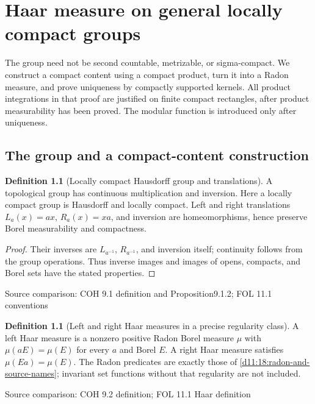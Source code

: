 \documentclass[11pt,oneside,openany]{book}
\theoremstyle{definition}
\newtheorem{definition}[theorem]{Definition}
\theoremstyle{remark}
\newcommand{\family}[1]{}
\newcommand{\source}[1]{\par\begingroup\small\sffamily\color{black!65}Source comparison: #1\par\endgroup}
\begin{document}


\chapter{Haar measure on general locally compact groups}\label{ch:d11-21}

The group need not be second countable, metrizable, or sigma-compact. We construct a compact content using a compact product, turn it into a Radon measure, and prove uniqueness by compactly supported kernels. All product integrations in that proof are justified on finite compact rectangles, after product measurability has been proved. The modular function is introduced only after uniqueness.

\section{The group and a compact-content construction}

\begin{definition}[Locally compact Hausdorff group and translations]\family{D11.21.lch_group_interface}\label{d11:21:lch-group-interface}
A topological group has continuous multiplication and inversion. Here a locally compact group is Hausdorff and locally compact. Left and right translations $L_a(x)=ax$, $R_a(x)=xa$, and inversion are homeomorphisms, hence preserve Borel measurability and compactness.
\end{definition}
\begin{proof}
Their inverses are $L_{a^{-1}}$, $R_{a^{-1}}$, and inversion itself; continuity follows from the group operations. Thus inverse images and images of opens, compacts, and Borel sets have the stated properties.
\end{proof}
\source{COH 9.1 definition and Proposition9.1.2; FOL 11.1 conventions}

\begin{definition}[Left and right Haar measures in a precise regularity class]\family{D11.21.haar_definition}\label{d11:21:haar-definition}
A left Haar measure is a nonzero positive Radon Borel measure $\mu$ with $\mu(aE)=\mu(E)$ for every $a$ and Borel $E$. A right Haar measure satisfies $\mu(Ea)=\mu(E)$. The Radon predicates are exactly those of \cref{d11:18:radon-and-source-names}; invariant set functions without that regularity are not included.
\end{definition}
\source{COH 9.2 definition; FOL 11.1 Haar definition}
\end{document}
